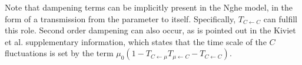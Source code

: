 Note that dampening terms can be implicitly present in the Nghe model, in the form of a transmission from the parameter to itself.
Specifically, $T_{C \leftarrow C}$ can fulfill this role. %
Second order dampening can also occur, 
as is pointed out in the Kiviet et al. supplementary information, which states that the time scale of the $C$ fluctuations is set by the term $\mu_0(1-T_{C \leftarrow \mu}T_{\mu \leftarrow C}-T_{C \leftarrow C})$.






